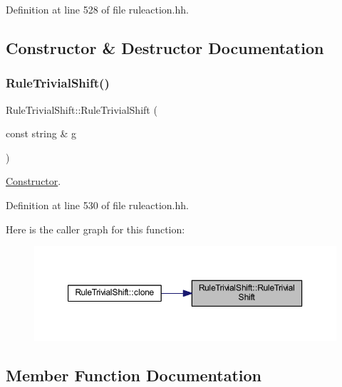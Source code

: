 Definition at line 528 of file ruleaction.\+hh.



\subsection{Constructor \& Destructor Documentation}
\mbox{\label{class_rule_trivial_shift_aaf74674402f18f94fcd7ce4675271ed5}} 
\subsubsection{\texorpdfstring{RuleTrivialShift()}{RuleTrivialShift()}}
{\footnotesize\ttfamily Rule\+Trivial\+Shift\+::\+Rule\+Trivial\+Shift (\begin{DoxyParamCaption}\item[{const string \&}]{g }\end{DoxyParamCaption})\hspace{0.3cm}{\ttfamily [inline]}}



\mbox{\hyperlink{class_constructor}{Constructor}}. 



Definition at line 530 of file ruleaction.\+hh.

Here is the caller graph for this function\+:
\nopagebreak
\begin{figure}[H]
\begin{center}
\leavevmode
\includegraphics[width=350pt]{class_rule_trivial_shift_aaf74674402f18f94fcd7ce4675271ed5_icgraph}
\end{center}
\end{figure}


\subsection{Member Function Documentation}
\mbox{\label{class_rule_trivial_shift_a373f11af57c1291eac63c4b69afde34a}} 

